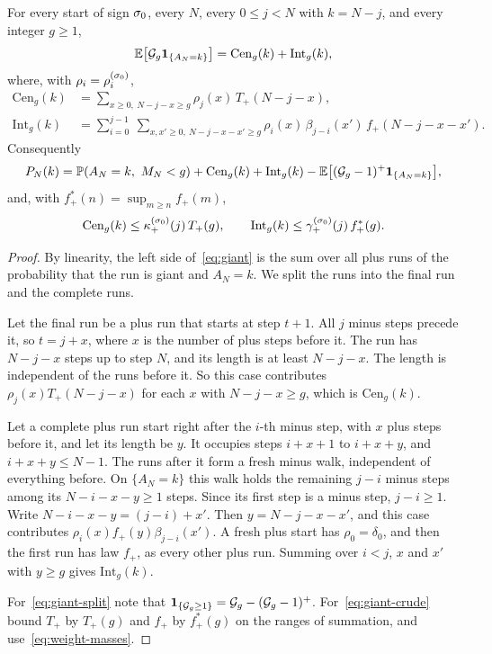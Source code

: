 \begin{lemma}\label{lem:giant}
For every start of sign $\sigma_0$, every $N$, every $0\le j<N$ with $k=N-j$, and
every integer $g\ge1$,
\begin{equation}\label{eq:giant}
 \mathbb{E}\bigl[\mathcal G_g\mathbf{1}_{\{A_N=k\}}\bigr]=\mathrm{Cen}_g(k)+\mathrm{Int}_g(k),
\end{equation}
where, with $\rho_i=\rho^{(\sigma_0)}_i$,
\begin{align*}
 \mathrm{Cen}_g(k)&=\sum_{x\ge0,\ N-j-x\ge g}\rho_j(x)\,T_\plus(N-j-x),\\
 \mathrm{Int}_g(k)&=\sum_{i=0}^{j-1}\ \sum_{x,x'\ge0,\ N-j-x-x'\ge g}\rho_i(x)\,\beta_{j-i}(x')\,f_\plus(N-j-x-x').
\end{align*}
Consequently
\begin{equation}\label{eq:giant-split}
 P_N(k)=\mathbb{P}(A_N=k,\ M_N<g)+\mathrm{Cen}_g(k)+\mathrm{Int}_g(k)
 -\mathbb{E}\bigl[(\mathcal G_g-1)^+\mathbf{1}_{\{A_N=k\}}\bigr],
\end{equation}
and, with $f^*_\plus(n)=\sup_{m\ge n}f_\plus(m)$,
\begin{equation}\label{eq:giant-crude}
 \mathrm{Cen}_g(k)\le\kappa^{(\sigma_0)}_{+}(j)\,T_{+}(g),\qquad
 \mathrm{Int}_g(k)\le\gamma^{(\sigma_0)}_{+}(j)\,f^*_{+}(g).
\end{equation}
\end{lemma}

\begin{proof}
By linearity, the left side of~\eqref{eq:giant} is the sum over all plus runs of
the probability that the run is giant and $A_N=k$. We split the runs into the
final run and the complete runs.

Let the final run be a plus run that starts at step $t+1$. All $j$ minus steps
precede it, so $t=j+x$, where $x$ is the number of plus steps before it. The run
has $N-j-x$ steps up to step $N$, and its length is at least $N-j-x$. The length is
independent of the runs before it. So this case contributes
$\rho_j(x)T_\plus(N-j-x)$ for each $x$ with $N-j-x\ge g$, which is
$\mathrm{Cen}_g(k)$.

Let a complete plus run start right after the $i$-th minus step, with $x$ plus
steps before it, and let its length be $y$. It occupies steps $i+x+1$ to $i+x+y$,
and $i+x+y\le N-1$. The runs after it form a fresh minus walk, independent of
everything before. On $\{A_N=k\}$ this walk holds the remaining $j-i$ minus steps
among its $N-i-x-y\ge1$ steps. Since its first step is a minus step, $j-i\ge1$.
Write $N-i-x-y=(j-i)+x'$. Then $y=N-j-x-x'$, and this case contributes
$\rho_i(x)f_\plus(y)\beta_{j-i}(x')$. A fresh plus start has $\rho_0=\delta_0$, and
then the first run has law $f_\plus$, as every other plus run. Summing over $i<j$,
$x$ and $x'$ with $y\ge g$ gives $\mathrm{Int}_g(k)$.

For~\eqref{eq:giant-split} note that
$\mathbf{1}_{\{\mathcal G_g\ge1\}}=\mathcal G_g-(\mathcal G_g-1)^+$.
For~\eqref{eq:giant-crude} bound $T_\plus$ by $T_\plus(g)$ and $f_\plus$ by
$f^*_\plus(g)$ on the ranges of summation, and use~\eqref{eq:weight-masses}.
\end{proof}

